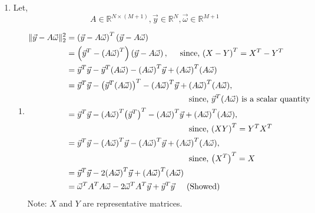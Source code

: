 \documentclass[11pt]{article} %
\begin{document}
\begin{enumerate}
\item
Let,
\[A \in \mathbb{R}^{N\times(M+1)}, \Vec y \in \mathbb{R}^{N}, \Vec \omega \in \mathbb{R}^{M+1}\]
\begin{enumerate}[\textbf{(\alph*)}]
\renewcommand{\labelenumi}{\bfseries\theenumi.}
\item 
\begin{equation*}
\begin{split}
\|\Vec y - A\Vec \omega\|_2^2 &= {\left(\Vec y - A\Vec \omega\right)}^T\left(\Vec y - A\Vec \omega\right)\\
&= \left({\Vec y}^T - {\left(A\Vec \omega\right)}^T\right)\left(\Vec y - A\Vec \omega\right), \hspace{0.5cm} \text{since, ${(X-Y)}^T = X^T - Y^T$}\\
&=\Vec y^T \Vec y - \Vec y^T(A\Vec \omega) - {(A\Vec \omega)}^T\Vec y + {(A\Vec \omega)}^T(A\Vec \omega)\\
&= \Vec y^T \Vec y - {\left(\Vec y^T(A\Vec \omega)\right)}^T - {(A\Vec \omega)}^T\Vec y + {(A\Vec \omega)}^T(A\Vec \omega),\\
&\hspace{5.25cm} \text{since, $\Vec y^T(A\Vec \omega)$ is a scalar quantity}\\
&= \Vec y^T \Vec y - {(A\Vec \omega)}^T{\left(\Vec y^T\right)}^T - {(A\Vec \omega)}^T\Vec y + {(A\Vec \omega)}^T(A\Vec \omega), \\
&\hspace{5.25cm} \text{since, ${(XY)}^T = Y^TX^T$}\\
&= \Vec y^T \Vec y - {(A\Vec \omega)}^T\Vec y - {(A\Vec \omega)}^T\Vec y + {(A\Vec \omega)}^T(A\Vec \omega), \\
&\hspace{5.25cm} \text{since, ${\left(X^T\right)}^T = X$}\\
&= \Vec y^T \Vec y - 2{(A\Vec \omega)}^T\Vec y+ {(A\Vec \omega)}^T(A\Vec \omega) \\
&= {\Vec \omega}^TA^TA\Vec \omega - 2{\Vec \omega}^TA^T \Vec y  + \Vec y^T \Vec y  \hspace{0.5cm} \text{(Showed)}
\end{split}
\end{equation*}
Note: $X$ and $Y$ are representative matrices.


\end{enumerate}
\end{enumerate}
\end{document}
